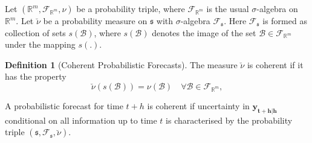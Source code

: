 \documentclass[a4paper, 11pt]{article}
\theoremstyle{theo}
\theoremstyle{definition}
\newtheorem{definition}{Definition}[section]
\begin{document}
Let $(\mathbb{R}^m, \mathscr{F}_{\mathbb{R}^m}, \nu)$ be a probability triple, where $\mathscr{F}_{\mathbb{R}^m}$ is the usual $\sigma$-algebra on $\mathbb{R}^m$. Let $\breve{\nu}$ be a probability measure on $\mathfrak{s}$ with $\sigma$-algebra $\mathscr{F}_{\mathfrak{s}}$.  Here $\mathscr{F}_{\mathfrak{s}}$ is formed as collection of sets $s(\mathcal{B})$, where $s(\mathcal{B})$ denotes the image of the set $\mathcal{B}\in \mathscr{F}_{\mathbb{R}^m}$ under the mapping $s(.)$.

\begin{definition}[Coherent Probabilistic Forecasts]\label{def:cohprob}
  The measure $\breve{\nu}$ is coherent if it has the property
  $$
      \breve{\nu}(s(\mathcal{B})) = \nu(\mathcal{B}) \quad \forall  \mathcal{B} \in \mathscr{F}_{\mathbb{R}^m},
    $$    
\end{definition}
A probabilistic forecast for time $t+h$ is coherent if uncertainty in $\bm{y_{t+h|h}}$ conditional on all information up to time $t$ is characterised by the probability triple $(\mathfrak{s},\mathscr{F}_{\mathfrak{s}},\breve{\nu})$.



\end{document}
